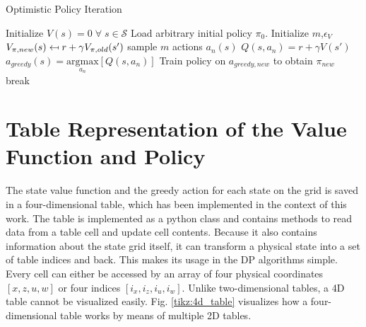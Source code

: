 \begin{algorithm}
	\caption{Optimistic Policy Iteration}
	\begin{algorithmic}[0] %
		\State
		\State Initialize $V(s) = 0 \; \forall \; s \in \mathcal{S}$
		\State Load arbitrary initial policy $\pi_0$.
		\State Initialize $m$,\;$\epsilon_V$
		\State
		\State $V_{\pi,new}(s) \mathrel{\reflectbox{\ensuremath{\mapsto}}} r+\gamma V_ {\pi,old}(s')$
		\EndFor
		\EndFunction
		\State
		\State sample $m$ actions $a_n(s)$
		\State $Q(s,a_n) = r + \gamma V(s')$
		\EndFor
		\State $a_{greedy}(s)=\underset{a_n}{\text{argmax}}[Q(s,a_n)]$
		\EndFor
		\EndFunction
			\State Train policy on $a_{greedy,new}$ to obtain $\pi_{new}$
		\State
		\State break
		\EndIf	
		\EndWhile
		\State
		\EndFunction
	\end{algorithmic}
	\label{algo:opi}
\end{algorithm}

\newpage
\section{Table Representation of the Value Function and Policy}
\label{appendix_C}

The state value function and the greedy action for each state on the grid is saved in a four-dimensional table, which has been implemented in the context of this work. The table is implemented as a python class and contains methods to read data from a table cell and update cell contents. Because it also contains information about the state grid itself, it can transform a physical state into a set of table indices and back. This makes its usage in the DP algorithms simple. Every cell can either be accessed by an array of four physical coordinates  $[x,z,u,w]$  or four indices $[i_x,i_z,i_u,i_w]$.  Unlike two-dimensional tables, a 4D table cannot be visualized easily. Fig. \ref{tikz:4d_table} visualizes how a four-dimensional table works by means of multiple 2D tables. 


